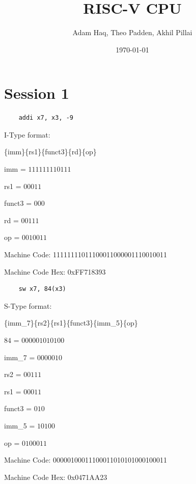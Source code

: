 \documentclass{article}
\title{RISC-V CPU}
\author{Adam Haq, Theo Padden, Akhil Pillai}
\date{\today}
\begin{document}
  \maketitle

  \section{Session 1}

    \begin{verbatim}
    addi x7, x3, -9
    \end{verbatim}

    I-Type format:

    \{imm\}\{rs1\}\{funct3\}\{rd\}\{op\}

    imm = $111111110111$

    rs1 = $00011$

    funct3 = $000$

    rd = $00111$

    op = $0010011$

    Machine Code:
    11111111011100011000001110010011

    Machine Code Hex:
    0xFF718393



    \begin{verbatim}
    sw x7, 84(x3)
    \end{verbatim}

    S-Type format:

    \{imm_7\}\{rs2\}\{rs1\}\{funct3\}\{imm_5\}\{op\}

    $84$ = $000001010100$

    imm_7 = $0000010$

    rs2 = $00111$

    rs1 = $00011$

    funct3 = $010$

    imm_5 = $10100$

    op = $0100011$

    Machine Code:
    00000100011100011010101000100011

    Machine Code Hex:
    0x0471AA23
\end{document}
